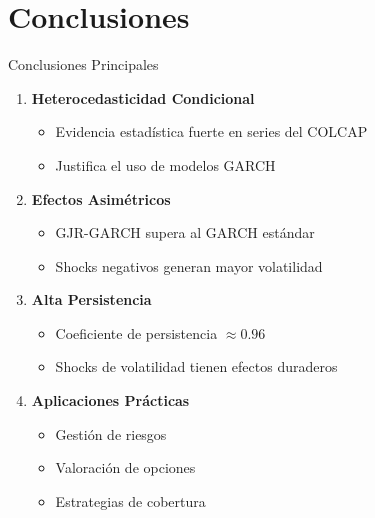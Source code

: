 \section{Conclusiones}

\begin{frame}{Conclusiones Principales}
    \begin{enumerate}
        \item<1-> \textbf{Heterocedasticidad Condicional}
        \begin{itemize}
            \item Evidencia estadística fuerte en series del COLCAP
            \item Justifica el uso de modelos GARCH
        \end{itemize}
        
        \item<2-> \textbf{Efectos Asimétricos}
        \begin{itemize}
            \item GJR-GARCH supera al GARCH estándar
            \item Shocks negativos generan mayor volatilidad
        \end{itemize}
        
        \item<3-> \textbf{Alta Persistencia}
        \begin{itemize}
            \item Coeficiente de persistencia $\approx 0.96$
            \item Shocks de volatilidad tienen efectos duraderos
        \end{itemize}
        
        \item<4-> \textbf{Aplicaciones Prácticas}
        \begin{itemize}
            \item Gestión de riesgos
            \item Valoración de opciones
            \item Estrategias de cobertura
        \end{itemize}
    \end{enumerate}
\end{frame}

